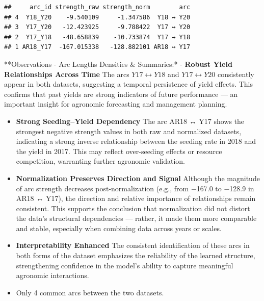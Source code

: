 \documentclass[
]{article}
\newenvironment{Shaded}{\begin{snugshade}}{\end{snugshade}}
\newcommand{\CommentTok}[1]{\textcolor[rgb]{0.56,0.35,0.01}{\textit{#1}}}
\newcommand{\FunctionTok}[1]{\textcolor[rgb]{0.13,0.29,0.53}{\textbf{#1}}}
\newcommand{\NormalTok}[1]{#1}
\newcommand{\OtherTok}[1]{\textcolor[rgb]{0.56,0.35,0.01}{#1}}
\newcommand{\SpecialCharTok}[1]{\textcolor[rgb]{0.81,0.36,0.00}{\textbf{#1}}}
\newcommand{\StringTok}[1]{\textcolor[rgb]{0.31,0.60,0.02}{#1}}
\begin{document}
\begin{Shaded}
\end{Shaded}

\begin{verbatim}
##     arc_id strength_raw strength_norm        arc
## 4  Y18_Y20    -9.540109     -1.347586  Y18 ↔ Y20
## 3  Y17_Y20   -12.423925     -9.788422  Y17 ↔ Y20
## 2  Y17_Y18   -48.658839    -10.733874  Y17 ↔ Y18
## 1 AR18_Y17  -167.015338   -128.882101 AR18 ↔ Y17
\end{verbatim}

**Observations - Arc Lengths Densities \& Summaries:* - \textbf{Robust
Yield Relationships Across Time} The arcs \(Y17 \leftrightarrow Y18\)
and \(Y17 \leftrightarrow Y20\) consistently appear in both datasets,
suggesting a temporal persistence of yield effects. This confirms that
past yields are strong indicators of future performance --- an important
insight for agronomic forecasting and management planning.

\begin{itemize}
\item
  \textbf{Strong Seeding--Yield Dependency} The arc AR18 ↔ Y17 shows the
  strongest negative strength values in both raw and normalized
  datasets, indicating a strong inverse relationship between the seeding
  rate in 2018 and the yield in 2017. This may reflect over-seeding
  effects or resource competition, warranting further agronomic
  validation.
\item
  \textbf{Normalization Preserves Direction and Signal} Although the
  magnitude of arc strength decreases post-normalization (e.g., from
  −167.0 to −128.9 in AR18 ↔ Y17), the direction and relative importance
  of relationships remain consistent. This supports the conclusion that
  normalization did not distort the data's structural dependencies ---
  rather, it made them more comparable and stable, especially when
  combining data across years or scales.
\item
  \textbf{Interpretability Enhanced} The consistent identification of
  these arcs in both forms of the dataset emphasizes the reliability of
  the learned structure, strengthening confidence in the model's ability
  to capture meaningful agronomic interactions.
\item
  Only 4 common arcs between the two datasets.
\end{itemize}
\end{document}
